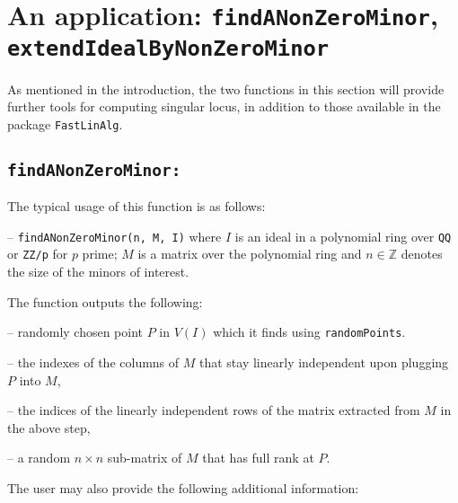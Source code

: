 \documentclass[11pt]{amsart}
\theoremstyle{definition}
\begin{document}




\section{An application:  {\tt findANonZeroMinor}, {\tt extendIdealByNonZeroMinor}}

As mentioned in the introduction, the two functions in this section will provide further tools for computing singular locus, in addition to those available in the package {\tt FastLinAlg}. 

\subsection{\tt findANonZeroMinor:}\label{findANonZeroMinor} The typical usage of this function is as follows: 

\vspace{0.5em}
-- {\tt findANonZeroMinor(n, M, I)} 
\vspace{0.5em}
\noindent where $I$ is an ideal
in a polynomial ring over {\tt QQ} or {\tt ZZ/p} for $p$ prime; $M$ is a matrix
over the polynomial ring and $n\in \mathbb{Z}$ denotes the size of the minors of interest.


The function outputs the following:

-- randomly chosen point $P$ in $V(I)$ which it finds using {\tt randomPoints}.

-- the indexes of the columns of $M$ that stay linearly independent upon plugging $P$ into $M$, 

-- the indices of the linearly independent rows of the matrix extracted from $M$ in the above step, 

-- a random $n\times n$ sub-matrix of $M$ that has full rank at $P$.

The user may also provide the following additional information: 
\end{document}
